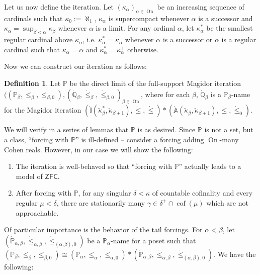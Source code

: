\documentclass[a4paper]{amsart}
\theoremstyle{definition}
\newtheorem{mydef}{Definition}[section]
\theoremstyle{remark}
\theoremstyle{plain}
\numberwithin{mydef}{section}
\DeclareMathOperator{\cof}{cof}
\DeclareMathOperator{\On}{On}
\newcommand{\dA}{\mathbb{A}}
\newcommand{\dI}{\mathbb{I}}
\newcommand{\dP}{\mathbb{P}}
\newcommand{\dQ}{\mathbb{Q}}
\newcommand{\ZFC}{\mathsf{ZFC}}
\begin{document}
	Let us now define the iteration. Let $(\kappa_{\alpha})_{\alpha\in\On}$ be an increasing sequence of cardinals such that $\kappa_0:=\aleph_1$, $\kappa_{\alpha}$ is supercompact whenever $\alpha$ is a successor and $\kappa_{\alpha}=\sup_{\beta<\alpha}\kappa_{\beta}$ whenever $\alpha$ is a limit. For any ordinal $\alpha$, let $\kappa_{\alpha}^*$ be the smallest regular cardinal above $\kappa_{\alpha}$, i.e. $\kappa_{\alpha}^*=\kappa_{\alpha}$ whenever $\alpha$ is a successor or $\alpha$ is a regular cardinal such that $\kappa_{\alpha}=\alpha$ and $\kappa_{\alpha}^*=\kappa_{\alpha}^+$ otherwise.
	
	Now we can construct our iteration as follows:
	
	\begin{mydef}
		Let $\dP$ be the direct limit of the full-support Magidor iteration $((\dP_{\beta},\leq_{\beta},\leq_{\beta,0}),(\dot{\dQ}_{\beta},\dot{\leq}_{\beta},\dot{\leq}_{\beta,0})_{\beta\in\On}$, where for each $\beta$, $\dot{\dQ}_{\beta}$ is a $\dP_{\beta}$-name for the Magidor iteration $(\dot{\dI}(\check{\kappa}_{\beta}^*,\check{\kappa}_{\beta+1}),\dot{\leq},\dot{\leq})*(\dot{\dA}(\check{\kappa}_{\beta},\check{\kappa}_{\beta+1}),\dot{\leq},\dot{\leq}_0)$.
	\end{mydef}
	
	We will verify in a series of lemmas that $\dP$ is as desired. Since $\dP$ is not a set, but a class, ``forcing with $\dP$'' is ill-defined -- consider a forcing adding $\On$-many Cohen reals. However, in our case we will show the following:
	
	\begin{enumerate}
		\item The iteration is well-behaved so that ``forcing with $\dP$'' actually leads to a model of $\ZFC$.
		\item After forcing with $\dP$, for any singular $\delta<\kappa$ of countable cofinality and every regular $\mu<\delta$, there are stationarily many $\gamma\in\delta^+\cap\cof(\mu)$ which are not approachable.
	\end{enumerate}
	
	Of particular importance is the behavior of the tail forcings. For $\alpha<\beta$, let $(\dot{\dP}_{\alpha,\beta},\dot{\leq}_{\alpha,\beta},\dot{\leq}_{(\alpha,\beta),0})$ be a $\dP_{\alpha}$-name for a poset such that $(\dP_{\beta},\leq_{\beta},\leq_{\beta,0})\cong(\dP_{\alpha},\leq_{\alpha},\leq_{\alpha,0})*(\dot{\dP}_{\alpha,\beta},\dot{\leq}_{\alpha,\beta},\dot{\leq}_{(\alpha,\beta),0})$. We have the following:
	
\end{document}
